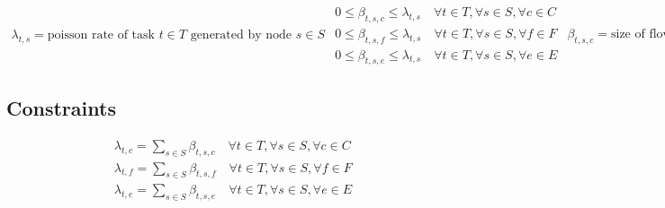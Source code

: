 \documentclass[conference]{IEEEtran}
\begin{document}
  \begin{subequations}
     \begin{align}
        \lambda_{t,s} = \text{poisson rate of task $t \in T$ generated by node $s \in S$}
     \end{align}

     \begin{align}
       0 \le \beta_{t,s,c} \le \lambda_{t,s}  \quad \forall{t \in T}, \forall{s \in S}, \forall{c \in C} \\
       0 \le \beta_{t,s,f} \le \lambda_{t,s}  \quad \forall{t \in T}, \forall{s \in S}, \forall{f \in F} \\
       0 \le \beta_{t,s,e} \le \lambda_{t,s}  \quad \forall{t \in T}, \forall{s \in S}, \forall{e \in E}
     \end{align}

     \begin{align}
       \beta_{t,s,c} = \text{size of flow of task $t \in T$ from node $s \in S$ to node $c \in C$}
     \end{align}

     \begin{align}
        \gamma_{t,s,c} =
        \begin{cases}
          1 & \text{flow of task $t \in T$ from node $s \in S$ to node $c \in C$ exists.}
          0 & \text{o.w.}
        \end{cases}
     \end{align}

     \begin{align}
        \gamma_{t,s,f} =
        \begin{cases}
          1 & \text{flow of task $t \in T$ from node $s \in S$ to node $f \in F$ exists.}
          0 & \text{o.w.}
        \end{cases}
     \end{align}

     \begin{align}
        \gamma_{t,s,e} =
        \begin{cases}
          1 & \text{flow of task $t \in T$ from node $s \in S$ to node $e \in E$ exists.}
          0 & \text{o.w.}
        \end{cases}
     \end{align}
   \end{subequations}

    \subsection{Constraints}
    \begin{subequations}
      \begin{align}
        \lambda_{t,c} = \sum_{s\in S}\beta_{t,s,c} \quad \forall{t \in T}, \forall{s \in S}, \forall{c \in C} \\
        \lambda_{t,f} = \sum_{s\in S}\beta_{t,s,f} \quad \forall{t \in T}, \forall{s \in S}, \forall{f \in F} \\
        \lambda_{t,e} = \sum_{s\in S}\beta_{t,s,e} \quad \forall{t \in T}, \forall{s \in S}, \forall{e \in E}
      \end{align}
    \end{subequations}
\end{document}
